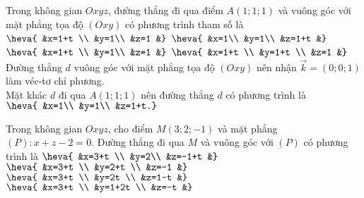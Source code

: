 \begin{ex}%
	Trong không gian $Oxyz$, đường thẳng đi qua điểm $A(1; 1; 1)$ và vuông góc với mặt phẳng tọa độ $(Oxy)$ có phương trình tham số là
	\choice
	{$\heva{	&x=1+t \\
			&y=1\\
			&z=1	&}$}
	{\True $\heva{	&x=1\\
			&y=1\\
			&z=1+t
			&}$}
	{$\heva{	&x=1+t \\
			&y=1\\
			&z=1	&}$}
	{$\heva{	&x=1+t \\
			&y=1+t \\
			&z=1	&}$}
	\loigiai
		{Đường thẳng $d$ vuông góc với mặt phẳng tọa độ $(Oxy)$ nên nhận $\overrightarrow{k}=(0; 0; 1)$ làm véc-tơ  chỉ phương.\\
		Mặt khác $d$ đi qua $A(1; 1; 1)$ nên đường thẳng $d$ có phương trình là $\heva{	&x=1\\
			&y=1\\
			&z=1+t.}$
		}
\end{ex}
\begin{ex}%
	Trong không gian $Oxyz$, cho điểm $M(3; 2;-1)$ và mặt phẳng $(P)\colon x+z-2=0$. Đường thẳng đi qua $M$ và vuông góc với $(P)$ có phương trình là
	\choice
	{\True $\heva{	&x=3+t \\
			&y=2\\
			&z=-1+t
			&}$}
	{$\heva{	&x=3+t \\
			&y=2+t \\
			&z=-1	&}$}
	{$\heva{	&x=3+t \\
			&y=2t \\
			&z=1-t
			&}$}
	{$\heva{	&x=3+t \\
			&y=1+2t \\
			&z=-t
			&}$}
\end{ex}
